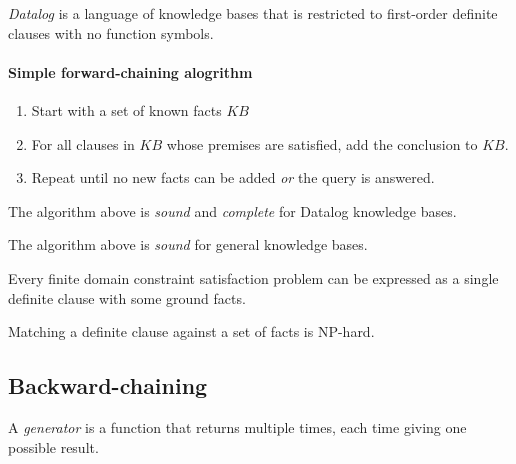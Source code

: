 \documentclass{article}
\begin{document}
\begin{definition}
    \emph{Datalog} is a language of knowledge bases that is restricted to first-order
    definite clauses with no function symbols.
\end{definition}

\paragraph{Simple forward-chaining alogrithm}

\begin{enumerate}
    \item Start with a set of known facts $KB$
    \item For all clauses in $KB$ whose premises are satisfied, add the conclusion to $KB$.
    \item Repeat until no new facts can be added \emph{or} the query is answered.
\end{enumerate}

\begin{theorem}
    The algorithm above is \emph{sound} and \emph{complete} for Datalog knowledge bases.
\end{theorem}

\begin{theorem}
    The algorithm above is \emph{sound} for general knowledge bases.
\end{theorem}

\begin{theorem}
    Every finite domain constraint satisfaction problem can be expressed as a 
    single definite clause with some ground facts.
\end{theorem}

\begin{theorem}
    Matching a definite clause against a set of facts is NP-hard.
\end{theorem}

\subsection{Backward-chaining}

\begin{definition}
    A \emph{generator} is a function that returns multiple times, each time giving one
    possible result.
\end{definition}
\end{document}
